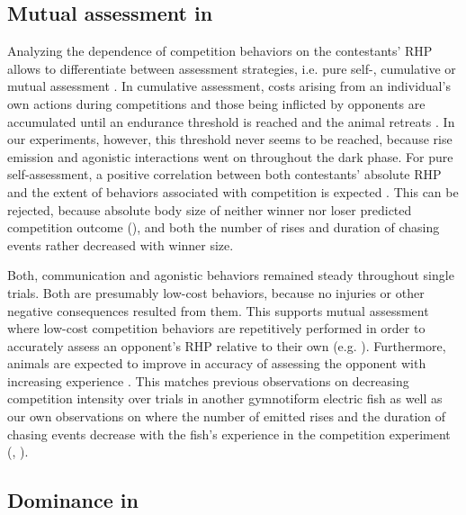 \subsection{Mutual assessment in \lepto{}}

Analyzing the dependence of competition behaviors on the contestants' RHP allows to differentiate between assessment strategies, i.e. pure self-, cumulative or mutual assessment \citep{ArnottElwood2009}. In cumulative assessment, costs arising from an individual's own actions during competitions and those being inflicted by opponents are accumulated until an endurance threshold is reached and the animal retreats \citep{Payne1998}. In our experiments, however, this threshold never seems to be reached, because rise emission and agonistic interactions went on throughout the dark phase. For pure self-assessment, a positive correlation between both contestants' absolute RHP and the extent of behaviors associated with competition is expected \citep{Taylor2001}. This can be rejected, because absolute body size of neither winner nor loser predicted competition outcome (), and both the number of rises and duration of chasing events rather decreased with winner size.

Both, communication and agonistic behaviors remained steady throughout single trials. Both are presumably low-cost behaviors, because no injuries or other negative consequences resulted from them. This supports mutual assessment where low-cost competition behaviors are repetitively performed in order to accurately assess an opponent's RHP relative to their own (e.g. \citealp{Cluttonbrock1979}). Furthermore, animals are expected to improve in accuracy of assessing the opponent with increasing experience \citep{Enquist1990, Grosenick2007}. This matches previous observations on decreasing competition intensity over trials in another gymnotiform electric fish \citep{Westby1970} as well as our own observations on \lepto{} where the number of emitted rises and the duration of chasing events decrease with the fish's experience in the competition experiment (, ).

\subsection{Dominance in \lepto{}}

